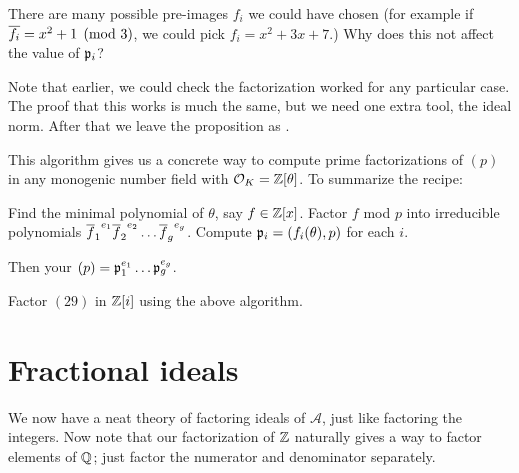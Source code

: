 \begin{ques}
	There are many possible pre-images $f_i$ we could have chosen
	(for example if $\overline{f_i} = x^2+1 \pmod 3$, we could pick $f_i = x^2 + 3x + 7$.)
	Why does this not affect the value of $\mathfrak p_i$?
\end{ques}

Note that earlier, we could check the factorization worked
for any particular case.
The proof that this works is much the same, but we need one extra tool, the ideal norm.
After that we leave the proposition as .

This algorithm gives us a concrete way to compute prime factorizations of $(p)$
in any monogenic number field with $\mathcal O_K = \mathbb Z[\theta]$. To summarize the recipe:
\begin{enumerate}
	\ii Find the minimal polynomial of $\theta$, say $f \in \mathbb Z[x]$.
	\ii Factor $f$ mod $p$ into irreducible polynomials
	${\overline f_1}^{e_1} {\overline f_2}^{e_2} \dots {\overline f_g}^{e_g}$.
	\ii Compute $\mathfrak p_i = (f_i(\theta), p)$ for each $i$.
\end{enumerate}
Then your $(p) = \mathfrak p_1^{e_1} \dots \mathfrak p_g^{e_g}$.

\begin{exercise}
	Factor $(29)$ in $\mathbb Z[i]$ using the above algorithm.
\end{exercise}


\section{Fractional ideals}
We now have a neat theory of factoring ideals of $\mathcal A$,
just like factoring the integers.
Now note that our factorization of $\mathbb Z$ naturally gives a way to factor
elements of $\mathbb Q$; just factor the numerator and denominator separately.

